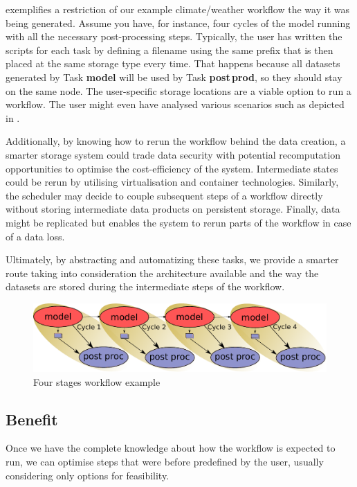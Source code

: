\documentclass[a4paper]{article}
\begin{document}
 exemplifies a restriction of our example climate/weather workflow the way it was being generated.
Assume you have, for instance, four cycles of the model running with all the necessary post-processing steps.
Typically, the user has written the scripts for each task by defining a filename using the same prefix that is then placed at the same storage type every time.
That happens because all datasets generated by Task \textbf{model} will be used by Task \textbf{post\,prod}, so they should stay on the same node.
The user-specific storage locations are a viable option to run a workflow.
The user might even have analysed various scenarios such as depicted in
.


Additionally, by knowing how to rerun the workflow behind the data creation, a smarter storage system could trade data security with potential recomputation opportunities to optimise the cost-efficiency of the system.
Intermediate states could be rerun by utilising virtualisation and container technologies.
Similarly, the scheduler may decide to couple subsequent steps of a workflow directly without storing intermediate data products on persistent storage.
Finally, data might be replicated but enables the system to rerun parts of the workflow in case of a data loss.

Ultimately, by abstracting and automatizing these tasks, we provide a smarter route taking into consideration the architecture available and the way the datasets are stored during the intermediate steps of the workflow.


\begin{figure}[H]
  \centering
  \includegraphics[width=0.8\columnwidth]{cycle4}
  \caption{Four stages workflow example}
  \label{fig:cycle4}
\end{figure}


\subsection{Benefit}

Once we have the complete knowledge about how the workflow is expected to run, we can optimise steps that were before predefined by the user, usually considering only options for feasibility.
\end{document}
